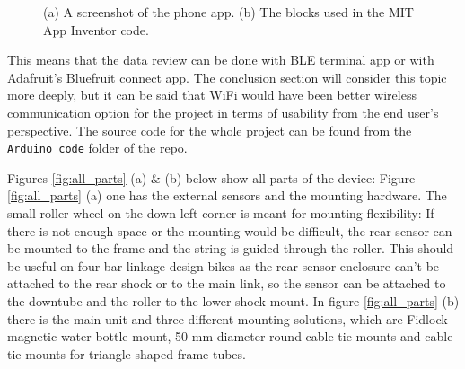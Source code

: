 \documentclass[a4paper,11pt]{article}
\begin{document}
\begin{figure}[H]
    \hfill
    \hfill
    \hfill
    \caption{(a) A screenshot of the phone app. (b) The blocks used in the MIT App Inventor code.}
    \label{fig:MIT_app}
\end{figure}

This means that the data review can be done with BLE terminal app or with Adafruit's Bluefruit connect app. The conclusion section will consider this topic more deeply, but it can be said that WiFi would have been better wireless communication option for the project in terms of usability from the end user's perspective. The source code for the whole project can be found from the \texttt{Arduino code} folder of the repo.

Figures \ref{fig:all_parts} (a) \& (b) below show all parts of the device: Figure \ref{fig:all_parts} (a) one has the external sensors and the mounting hardware. The small roller wheel on the down-left corner is meant for mounting flexibility: If there is not enough space or the mounting would be difficult, the rear sensor can be mounted to the frame and the string is guided through the roller. This should be useful on four-bar linkage design bikes as the rear sensor enclosure can't be attached to the rear shock or to the main link, so the sensor can be attached to the downtube and the roller to the lower shock mount. In figure \ref{fig:all_parts} (b) there is the main unit and three different mounting solutions, which are Fidlock magnetic water bottle mount, 50 mm diameter round cable tie mounts and cable tie mounts for triangle-shaped frame tubes.
\end{document}
